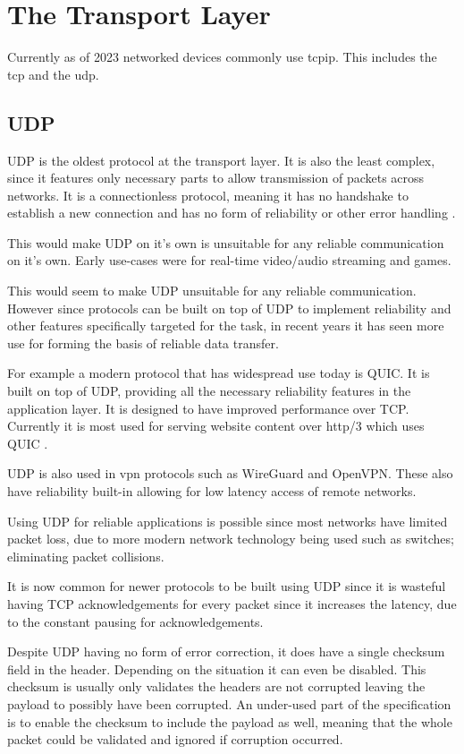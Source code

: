 \section{The Transport Layer}
Currently as of 2023 networked devices commonly use \acrfull{tcpip}. This includes the \acrfull{tcp} and the \acrfull{udp}.

\subsection*{UDP}
UDP is the oldest protocol at the transport layer. It is also the least complex, since it features only necessary parts to allow transmission of packets across networks. It is a connectionless protocol, meaning it has no handshake to establish a new connection and has no form of reliability or other error handling \parencite{udp-rfc768}.

This would make UDP on it's own is unsuitable for any reliable communication on it's own. Early use-cases were for real-time video/audio streaming and games.

This would seem to make UDP unsuitable for any reliable communication. However since protocols can be built on top of UDP to implement reliability and other features specifically targeted for the task, in recent years it has seen more use for forming the basis of reliable data transfer.

For example a modern protocol that has widespread use today is QUIC. It is built on top of UDP, providing all the necessary reliability features in the application layer. It is designed to have improved performance over TCP. Currently it is most used for serving website content over http/3 which uses QUIC \parencite{carlucci2015http}.

UDP is also used in \acrfull{vpn} protocols such as WireGuard and OpenVPN. These also have reliability built-in allowing for low latency access of remote networks.

Using UDP for reliable applications is possible since most networks have limited packet loss, due to more modern network technology being used such as switches; eliminating packet collisions.

It is now common for newer protocols to be built using UDP since it is wasteful having TCP acknowledgements for every packet since it increases the latency, due to the constant pausing for acknowledgements.

Despite UDP having no form of error correction, it does have a single checksum field in the header. Depending on the situation it can even be disabled. This checksum is usually only validates the headers are not corrupted leaving the payload to possibly have been corrupted. An under-used part of the specification is to enable the checksum to include the payload as well, meaning that the whole packet could be validated and ignored if corruption occurred.

